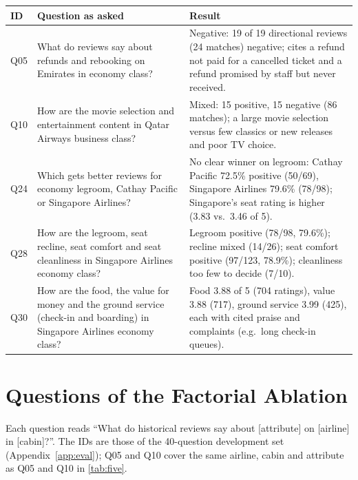 \documentclass[10pt,twocolumn,a4paper]{article}
\begin{document}
\begin{center}\small
\begin{tabularx}{\textwidth}{@{}lP{62mm}Y@{}}
\toprule
\textbf{ID} & \textbf{Question as asked} & \textbf{Result} \\
\midrule
Q05 & What do reviews say about refunds and rebooking on Emirates in economy class? & Negative: 19 of 19 directional reviews (24 matches) negative; cites a refund not paid for a cancelled ticket and a refund promised by staff but never received. \\
Q10 & How are the movie selection and entertainment content in Qatar Airways business class? & Mixed: 15 positive, 15 negative (86 matches); a large movie selection versus few classics or new releases and poor TV choice. \\
Q24 & Which gets better reviews for economy legroom, Cathay Pacific or Singapore Airlines? & No clear winner on legroom: Cathay Pacific 72.5\% positive (50/69), Singapore Airlines 79.6\% (78/98); Singapore's seat rating is higher (3.83 vs.\ 3.46 of 5). \\
Q28 & How are the legroom, seat recline, seat comfort and seat cleanliness in Singapore Airlines economy class? & Legroom positive (78/98, 79.6\%); recline mixed (14/26); seat comfort positive (97/123, 78.9\%); cleanliness too few to decide (7/10). \\
Q30 & How are the food, the value for money and the ground service (check-in and boarding) in Singapore Airlines economy class? & Food 3.88 of 5 (704 ratings), value 3.88 (717), ground service 3.99 (425), each with cited praise and complaints (e.g.\ long check-in queues). \\
\bottomrule
\end{tabularx}
\end{center}

\section{Questions of the Factorial Ablation}
\label{app:factorial}

Each question reads ``What do historical reviews say about [attribute] on [airline] in [cabin]?''. The IDs are
those of the 40-question development set (Appendix~\ref{app:eval}); Q05 and Q10 cover the same airline, cabin and attribute
as Q05 and Q10 in \cref{tab:five}.
\end{document}
